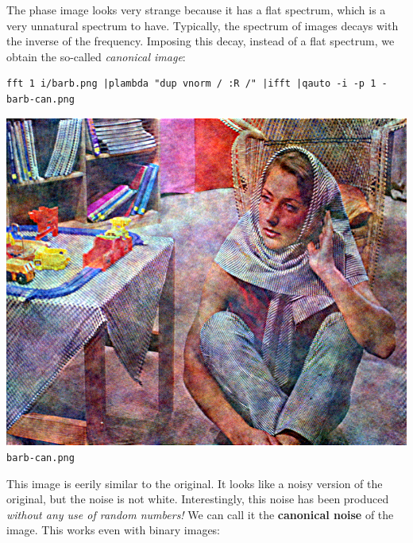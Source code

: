The phase image looks very strange because it has a flat spectrum, which is a
very unnatural spectrum to have.  Typically, the spectrum of images decays
with the inverse of the frequency.  Imposing this decay, instead of a flat
spectrum, we obtain the so-called {\em canonical image}:

\begin{verbatim}
fft 1 i/barb.png |plambda "dup vnorm / :R /" |ifft |qauto -i -p 1 - barb-can.png
\end{verbatim}
\includegraphics{barb-can.png}\verb+barb-can.png+


This image is eerily similar to the original.  It looks like a noisy version
of the original, but the noise is not white.  Interestingly, this noise has
been produced \emph{without any use of random numbers!}  We can call it the
{\bf canonical noise} of the image.  This works even with binary images:


